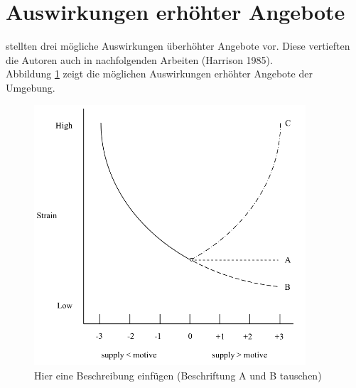 \section{Auswirkungen erhöhter Angebote}
\label{ch:personEnvironmentFit:auswirkungenErhoehterAngebote}
\textcite{mechanismsOfJobStressAndStrain:1982} stellten drei mögliche Auswirkungen überhöhter Angebote vor. Diese vertieften die Autoren auch in nachfolgenden Arbeiten \cite[S. 5f.]{caplan:1987}\cite{harrison:1978}(Harrison 1985).\\
Abbildung \ref{fig:personEnvironmentFit:auswirkungenErhoehterAngebote:abb1} zeigt die möglichen Auswirkungen erhöhter Angebote der Umgebung.\\
\begin{figure}[h]
	\centering
	\includegraphics[width=0.9\textwidth]{gfx/ueberschuss_supply_motive.png}
	\caption{Hier eine Beschreibung einfügen (Beschriftung A und B tauschen) \cite[S. 23]{edwards:2008}}
	\label{fig:personEnvironmentFit:auswirkungenErhoehterAngebote:abb1}
\end{figure}
\\
